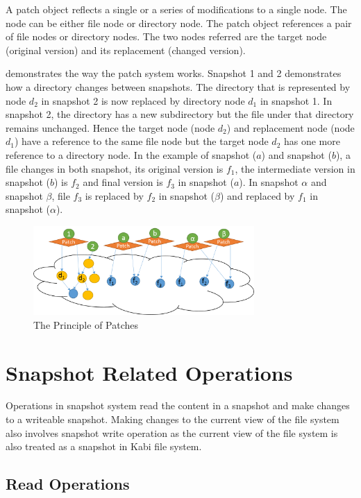    A patch object reflects a single or a series of modifications to a single node. The node can be either file node or directory node. The patch object references a pair of file nodes or directory nodes. The two nodes referred are the target node (original version) and its replacement (changed version).

     demonstrates the way the patch system works. Snapshot 1 and 2 demonstrates how a directory changes between snapshots. The directory that is represented by node $d_2$ in snapshot 2 is now replaced by directory node $d_1$ in snapshot 1. In snapshot 2, the directory has a new subdirectory but the file under that directory remains unchanged. Hence the target node (node $d_2$) and replacement node (node $d_1$) have a reference to the same file node but the target node $d_2$ has one more reference to a directory node. In the example of snapshot ($a$) and snapshot ($b$), a file changes in both snapshot, its original version is $f_1$, the intermediate version in snapshot ($b$) is $f_2$ and final version is $f_3$ in snapshot ($a$). In snapshot $\alpha$ and snapshot $\beta$, file $f_3$ is replaced by $f_2$ in snapshot ($\beta$) and replaced by $f_1$ in snapshot ($\alpha$).  

\begin{figure}[t]
\centering
\includegraphics[width=0.75\textwidth]{Chapter-4/figs/fig14.png}
\caption{The Principle of Patches}
\label{fig:patches}
\end{figure}

\section{Snapshot Related Operations}

    Operations in snapshot system read the content in a snapshot and make changes to a writeable snapshot. Making changes to the current view of the file system also involves snapshot write operation as the current view of the file system is also treated as a snapshot in Kabi file system.

\subsection{Read Operations}

